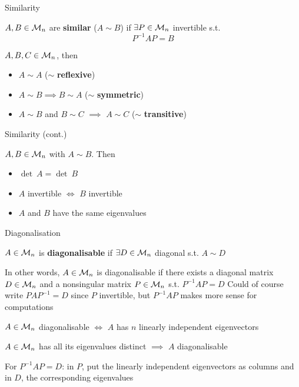 \documentclass[aspectratio=169]{beamer}
\begin{document}
\begin{frame}{Similarity}
\begin{definition}[Similarity]
$A,B\in\mathcal{M}_n$ are \textbf{similar} ($A\sim B$) if $\exists P\in\mathcal{M}_n$ invertible s.t.
\[
P^{-1}AP=B
\]
\end{definition}
\begin{theorem}
$A,B,C\in\mathcal{M}_n$, then
\begin{itemize}
	\item $A\sim A$ \hfill ($\sim$ \textbf{reflexive})
	\item $A\sim B\implies B\sim A$ \hfill ($\sim$ \textbf{symmetric})
	\item $A\sim B$ and $B\sim C$ $\implies$ $A\sim C$ \hfill ($\sim$ \textbf{transitive})
\end{itemize}
\end{theorem}
\end{frame}

\begin{frame}{Similarity (cont.)}
\begin{theorem}
$A,B\in\mathcal{M}_n$ with $A\sim B$. Then
\begin{itemize}
	\item $\det\ A=\det\ B$
	\item $A$ invertible $\iff$ $B$ invertible
	\item $A$ and $B$ have the same eigenvalues
\end{itemize}
\end{theorem}
\end{frame}


\begin{frame}{Diagonalisation}
\begin{definition}[Diagonalisability]
$A\in\mathcal{M}_n$ is \textbf{diagonalisable} if $\exists D\in\mathcal{M}_n$ diagonal s.t. $A\sim D$
\end{definition}
\vfill
In other words, $A\in\mathcal{M}_n$ is diagonalisable if there exists a diagonal matrix $D\in\mathcal{M}_n$ and a nonsingular matrix $P\in\mathcal{M}_n$ s.t. $P^{-1}AP=D$
\vfill
Could of course write $PAP^{-1}=D$ since $P$ invertible, but $P^{-1}AP$ makes more sense for computations
\end{frame}


\begin{frame}
\begin{importanttheorem}
$A\in\mathcal{M}_n$ diagonalisable $\iff$ $A$ has $n$ linearly independent eigenvectors
\end{importanttheorem}
\vfill
\begin{corollary}
$A\in\mathcal{M}_n$ has all its eigenvalues distinct $\implies$ $A$ diagonalisable
\end{corollary}
\vfill
For $P^{-1}AP=D$: in $P$, put the linearly independent eigenvectors as columns and in $D$, the corresponding eigenvalues
\end{frame}
\end{document}
